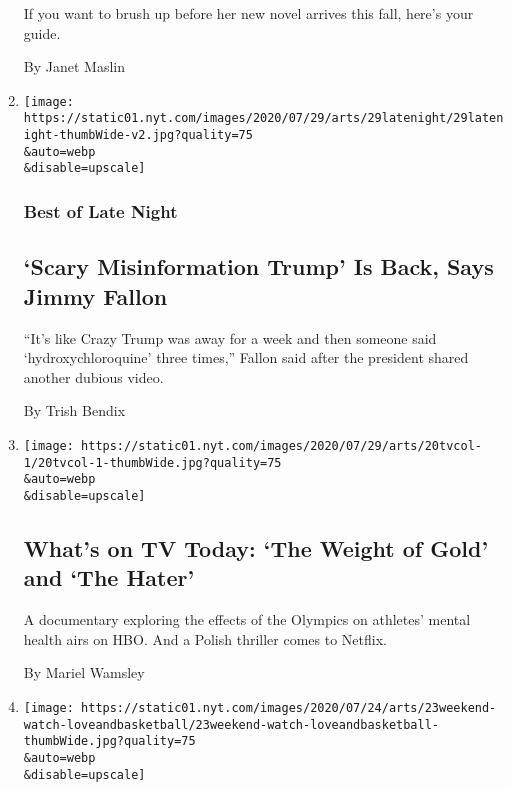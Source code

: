\begin{enumerate}
  If you want to brush up before her new novel arrives this fall, here's
  your guide.

  By Janet Maslin
\item
  \href{/2020/07/29/arts/television/late-night-trump-coronavirus-hydroxychloroquine.html}{}

  \texttt{[image: https://static01.nyt.com/images/2020/07/29/arts/29latenight/29latenight-thumbWide-v2.jpg?quality=75\\\&auto=webp\\\&disable=upscale]}

  \hypertarget{best-of-late-night}{%
  \subsubsection{Best of Late Night}\label{best-of-late-night}}

  \hypertarget{scary-misinformation-trump-is-back-says-jimmy-fallon}{%
  \subsection{`Scary Misinformation Trump' Is Back, Says Jimmy
  Fallon}\label{scary-misinformation-trump-is-back-says-jimmy-fallon}}

  ``It's like Crazy Trump was away for a week and then someone said
  `hydroxychloroquine' three times,'' Fallon said after the president
  shared another dubious video.

  By Trish Bendix
\item
  \href{/2020/07/29/arts/television/whats-on-tv-today-the-weight-of-gold-and-the-hater.html}{}

  \texttt{[image: https://static01.nyt.com/images/2020/07/29/arts/20tvcol-1/20tvcol-1-thumbWide.jpg?quality=75\\\&auto=webp\\\&disable=upscale]}

  \hypertarget{whats-on-tv-today-the-weight-of-gold-and-the-hater}{%
  \subsection{What's on TV Today: `The Weight of Gold' and `The
  Hater'}\label{whats-on-tv-today-the-weight-of-gold-and-the-hater}}

  A documentary exploring the effects of the Olympics on athletes'
  mental health airs on HBO. And a Polish thriller comes to Netflix.

  By Mariel Wamsley
\item
  \href{/2020/07/28/movies/love-basketball-viewing-party.html}{}

  \texttt{[image: https://static01.nyt.com/images/2020/07/24/arts/23weekend-watch-loveandbasketball/23weekend-watch-loveandbasketball-thumbWide.jpg?quality=75\\\&auto=webp\\\&disable=upscale]}


\end{enumerate}
